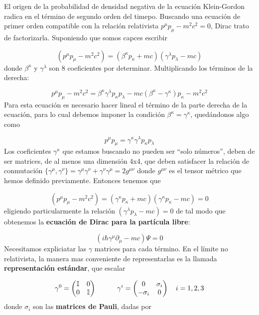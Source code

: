El origen de la probabilidad de densidad negativa de la ecuación Klein-Gordon radica en el término de segundo orden del timepo. Buscando una ecuación de primer orden compatible con la relación relativista $p^\mu p_\mu - m^2 c^2 =0$, Dirac trato de factorizarla. Suponiendo que somos capces escribir

\begin{equation}
    (p^\mu p_\mu -m^2 c^2) = (\beta^\kappa p_\kappa + mc)(\gamma^\lambda  p_\lambda - mc)
\end{equation}
donde $\beta^\kappa$ y $\gamma^\lambda$ son 8 coeficientes por determinar. Multiplicando los términos de la derecha:

\begin{equation}
p^\mu p_\mu - m^2 c^2 = \beta^\kappa \gamma^\lambda p_\kappa p_\lambda - mc (\beta^\kappa - \gamma^\kappa) p_\kappa - m^2 c^2
\end{equation}
Para esta ecuación es necesario hacer lineal el término de la parte derecha de la ecuación, para lo cual debemos imponer la condición $\beta^\kappa = \gamma ^\kappa$, quedándonos algo como 

\begin{equation}
    p^\mu p_\mu = \gamma^\kappa \gamma^\lambda p_\kappa p_\lambda
\end{equation}
Los coeficientes $\gamma^\kappa$ que estamos buscando no pueden ser ``solo números'', deben de ser matrices, de al menos una dimensión 4x4, que deben satisfacer la relación de conmutación $\{ \gamma^\mu , \gamma^\nu \} = \gamma^\mu \gamma^\nu + \gamma^\nu \gamma^\mu = 2 g^{\mu \nu}$ donde $g^{\mu \nu}$ es el tensor métrico que hemos definido previamente. Entonces tenemos que

\begin{equation}
    (p^\mu p_\mu - m^2 c^2) = (\gamma^\kappa p_\kappa + mc ) (\gamma^\kappa p_\kappa - mc ) = 0
\end{equation}
eligiendo particularmente la relación $(\gamma^\lambda p_\lambda - mc)=0$ de tal modo que obtenemos la {\bf ecuación de Dirac para la partícula libre}:

\begin{equation}
    (i \hbar \gamma^\mu \partial_\mu - mc) \Psi = 0
\end{equation}
Necesitamos expliciatar las $\gamma$ matrices para cada término. En el límite no relativista, la manera mas conveniente de representarlas es la llamada \textbf{representación estándar}, que escalar

\begin{equation}
    \gamma^0 = \begin{pmatrix}
    \mathbb{I} & 0 \\
    0 & \mathbb{I} 
    \end{pmatrix} \quad \quad \quad
    \gamma^i = \begin{pmatrix}
    0 & \sigma_i \\
    -\sigma_i & 0 
    \end{pmatrix} \quad i=1,2,3
\end{equation}
donde $\sigma_i$ son las {\bf matrices de Pauli}, dadas por

